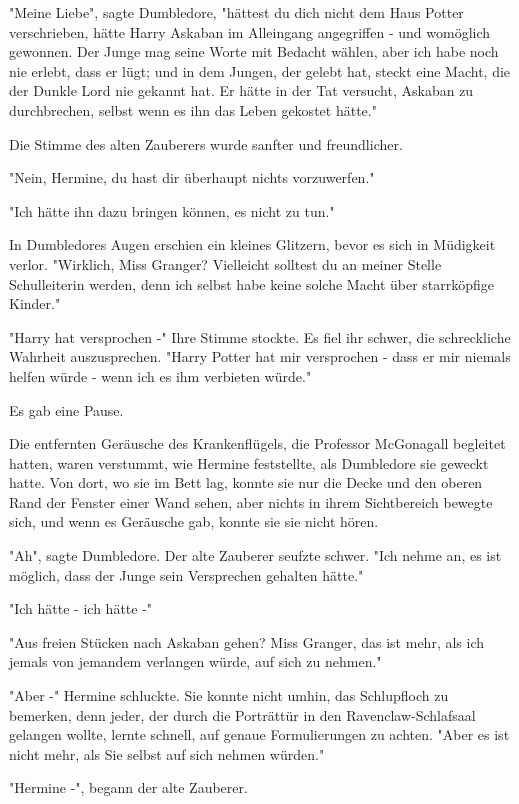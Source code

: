{"Meine Liebe", sagte Dumbledore, "hättest du dich nicht dem Haus Potter verschrieben, hätte Harry Askaban im Alleingang angegriffen - und womöglich gewonnen. Der Junge mag seine Worte mit Bedacht wählen, aber ich habe noch nie erlebt, dass er lügt; und in dem Jungen, der gelebt hat, steckt eine Macht, die der Dunkle Lord nie gekannt hat. Er hätte in der Tat versucht, Askaban zu durchbrechen, selbst wenn es ihn das Leben gekostet hätte."

Die Stimme des alten Zauberers wurde sanfter und freundlicher.

"Nein, Hermine, du hast dir überhaupt nichts vorzuwerfen."

"Ich hätte ihn dazu bringen können, es nicht zu tun."

In Dumbledores Augen erschien ein kleines Glitzern, bevor es sich in Müdigkeit verlor. "Wirklich, Miss Granger? Vielleicht solltest du an meiner Stelle Schulleiterin werden, denn ich selbst habe keine solche Macht über starrköpfige Kinder."

"Harry hat versprochen -" Ihre Stimme stockte. Es fiel ihr schwer, die schreckliche Wahrheit auszusprechen. "Harry Potter hat mir versprochen - dass er mir niemals helfen würde - wenn ich es ihm verbieten würde."

Es gab eine Pause.

Die entfernten Geräusche des Krankenflügels, die Professor McGonagall begleitet hatten, waren verstummt, wie Hermine feststellte, als Dumbledore sie geweckt hatte. Von dort, wo sie im Bett lag, konnte sie nur die Decke und den oberen Rand der Fenster einer Wand sehen, aber nichts in ihrem Sichtbereich bewegte sich, und wenn es Geräusche gab, konnte sie sie nicht hören.

"Ah", sagte Dumbledore. Der alte Zauberer seufzte schwer. "Ich nehme an, es ist möglich, dass der Junge sein Versprechen gehalten hätte."

"Ich hätte - ich hätte -"

"Aus freien Stücken nach Askaban gehen? Miss Granger, das ist mehr, als ich jemals von jemandem verlangen würde, auf sich zu nehmen."

"Aber -" Hermine schluckte. Sie konnte nicht umhin, das Schlupfloch zu bemerken, denn jeder, der durch die Porträttür in den Ravenclaw-Schlafsaal gelangen wollte, lernte schnell, auf genaue Formulierungen zu achten. "Aber es ist nicht mehr, als Sie selbst auf sich nehmen würden."

"Hermine -", begann der alte Zauberer.

}
